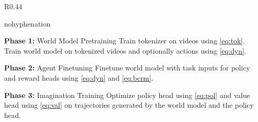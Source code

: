 \begin{wrapfigure}[21]{R}{0.44\textwidth}
\vspace*{-5ex}\hfill%
\begin{minipage}{0.43\textwidth}
\begin{algorithm}[H]
\caption{\enskip\method}
\label{alg:agent}
\begin{hyphenrules}{nohyphenation}

\begin{algorithmic}[1]
\setlength{\itemsep}{.5ex}

\vspace{1ex}
\Statex \hspace*{-2.3ex}\textbf{Phase 1:} World Model Pretraining
\State Train tokenizer on videos using \cref{eq:tok}.
\State Train world model on tokenized videos and optionally actions using \cref{eq:dyn}.

\vspace{1ex}
\Statex \hspace*{-2.3ex}\textbf{Phase 2:} Agent Finetuning
\State Finetune world model with task inputs for policy and reward heads using \cref{eq:dyn} and \cref{eq:bcrm}.

\vspace{1ex}
\Statex \hspace*{-2.3ex}\textbf{Phase 3:} Imagination Training
\State Optimize policy head using \cref{eq:pol} and value head using \cref{eq:val} on trajectories generated by the world model and the policy head.
\vspace{1ex}

\end{algorithmic}
\end{hyphenrules}
\end{algorithm}
\end{minipage}
\end{wrapfigure}